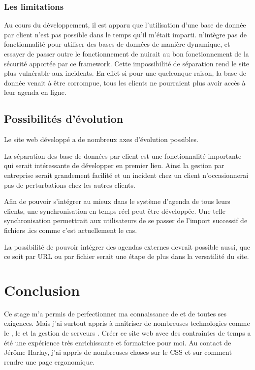 \documentclass[a4paper, 11pt]{report}
\begin{document}
    \subsection{Les limitations}
    Au cours du développement, il est apparu que l'utilisation d'une base de donnée par client n'est pas possible dans le temps qu'il m'était imparti. \symfony n'intègre pas de fonctionnalité pour utiliser des bases de données de manière dynamique, et essayer de passer outre le fonctionnement de \symfony nuirait au bon fonctionnement de la sécurité apportée par ce framework. Cette impossibilité de séparation rend le site plus vulnérable aux incidents. En effet si pour une quelconque raison, la base de donnée venait à être corrompue, tous les clients ne pourraient plus avoir accès à leur agenda en ligne.

\section{Possibilités d'évolution}
    Le site web développé a de nombreux axes d'évolution possibles.

    La séparation des base de données par client est une fonctionnalité importante qui serait intéressante de développer en premier lieu. Ainsi la gestion par entreprise serait grandement facilité et un incident chez un client n’occasionnerai pas de perturbations chez les autres clients.

    Afin de pouvoir s'intégrer au mieux dans le système d'agenda de tous leurs clients, une synchronisation en temps réel peut être développée. Une telle synchronisation permettrait aux utilisateurs de se passer de l'import successif de fichiers .ics comme c'est actuellement le cas.

    La possibilité de pouvoir intégrer des agendas externes devrait possible aussi, que ce soit par URL ou par fichier serait une étape de plus dans la versatilité du site.

\chapter{Conclusion}
    Ce stage m'a permis de perfectionner ma connaissance de \symfony et de toutes ses exigences. Mais j'ai surtout appris à maîtriser de nombreuses technologies comme le \js, le \jq et la gestion de serveurs \njs. Créer ce site web avec des contraintes de temps a été une expérience très enrichissante et formatrice pour moi. Au contact de Jérôme Harlay, j'ai appris de nombreuses choses sur le CSS et sur comment rendre une page ergonomique.
\end{document}
